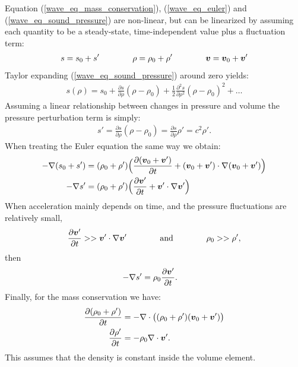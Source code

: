 Equation (\ref{wave_eq_mass_conservation}), (\ref{wave_eq_euler}) and (\ref{wave_eq_sound_pressure}) are non-linear, but can be linearized by assuming each quantity to be a steady-state, time-independent value plus a fluctuation term:
%
\begin{align}
s = s_0 + s'  \qquad\qquad \rho = \rho_0 + \rho' \qquad\qquad \boldsymbol{v} = \boldsymbol{v}_0 + \boldsymbol{v}'
\end{align}
%
Taylor expanding (\ref{wave_eq_sound_pressure}) around zero yields:
%
\begin{align}
s(\rho) = s_0 + \frac{\partial s}{\partial\rho}(\rho-\rho_0) + \frac{1}{2}\frac{\partial^2 s}{\partial\rho^2}(\rho-\rho_0)^2 + \dots\label{wave_eq_sound_taylor_full}
\end{align}
%
Assuming a linear relationship between changes in pressure and volume the pressure perturbation term is simply:
%
\begin{align}
s' = \frac{\partial s}{\partial\rho}(\rho-\rho_0) = \frac{\partial s}{\partial\rho}\rho' = c^2\rho'. \label{wave_eq_sound_taylor_first}
\end{align}
%
When treating the Euler equation the same way we obtain:
%
\begin{align}
-\nabla (s_0 + s') &= (\rho_0 + \rho') \Big(\frac{\partial(\boldsymbol{v}_0 + \boldsymbol{v}')}{\partial t} + (\boldsymbol{v}_0 + \boldsymbol{v}')\cdot\nabla(\boldsymbol{v}_0 + \boldsymbol{v}')\Big) \nonumber\\
-\nabla s' &= (\rho_0 + \rho') \Big(\frac{\partial\boldsymbol{v}'}{\partial t} + \boldsymbol{v}'\cdot\nabla\boldsymbol{v}'\Big) \nonumber\\
\end{align}
%
When acceleration mainly depends on time, and the pressure fluctuations are relatively small,
%
\begin{align}
\frac{\partial\boldsymbol{v}'}{\partial t} >> \boldsymbol{v}'\cdot\nabla\boldsymbol{v}' \qquad\qquad\text{and}\qquad\qquad \rho_0 >> \rho',
\end{align}
%
then
%
\begin{align}
-\nabla s' &= \rho_0 \frac{\partial\boldsymbol{v}'}{\partial t}.
\end{align}
%
Finally, for the mass conservation we have:
%
\begin{align}
\frac{\partial(\rho_0 + \rho')}{\partial t} &= -\nabla \cdot \big((\rho_0 + \rho')(\boldsymbol{v}_0 + \boldsymbol{v}')\big)\nonumber\\
\frac{\partial\rho'}{\partial t} &= -\rho_0\nabla \cdot \boldsymbol{v}'. \label{wave_eq_mass_conservation2}
\end{align}
%
This assumes that the density is constant inside the volume element.

